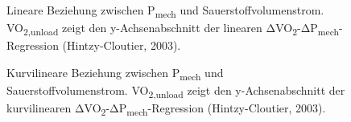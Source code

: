 \documentclass[
  letterpaper,
  DIV=11]{scrartcl}
\begin{document}
\begin{figure}


\caption{\label{fig-Hintzy_Cloutier_linear}Lineare Beziehung zwischen
P\textsubscript{mech} und Sauerstoffvolumenstrom.
VO\textsubscript{2,unload} zeigt den y-Achsenabschnitt der linearen
ΔVO\textsubscript{2}-ΔP\textsubscript{mech}-Regression (Hintzy-Cloutier,
2003).}

\end{figure}%

\begin{figure}


\caption{\label{fig-Hintzy_Cloutier_curvilinear}Kurvilineare Beziehung
zwischen P\textsubscript{mech} und Sauerstoffvolumenstrom.
VO\textsubscript{2,unload} zeigt den y-Achsenabschnitt der kurvilinearen
ΔVO\textsubscript{2}-ΔP\textsubscript{mech}-Regression (Hintzy-Cloutier,
2003).}

\end{figure}%
\end{document}
